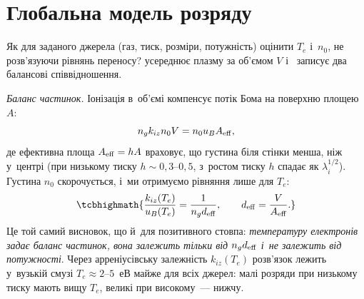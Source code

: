 \section{Глобальна модель розряду}\label{sec:global-model}

Як для заданого джерела (газ, тиск, розміри, потужність) оцінити $T_e$ і~$n_0$, не
розв'язуючи рівнянь переносу?  усереднює плазму за об'ємом $V$ і~
записує два балансові співвідношення.

\emph{Баланс частинок.} Іонізація в~об'ємі компенсує потік Бома на поверхню площею $A$:
\begin{equation*}
	n_gk_{iz}n_0V=n_0u_BA_{\rm eff},
\end{equation*}
де ефективна площа $A_{\rm eff}=h A$ враховує, що густина біля стінки менша, ніж у~центрі
(при низькому тиску $h\sim0{,}3$--$0{,}5$, з~ростом тиску $h$ спадає як $\lambda_i^{1/2}$). Густина $n_0$ скорочується, і~ми
отримуємо рівняння лише для $T_e$:
\begin{equation}\label{eq:global-te}
	\tcbhighmath{\frac{k_{iz}(T_e)}{u_B(T_e)}=\frac1{n_gd_{\rm eff}},\qquad d_{\rm eff}=\frac V{A_{\rm eff}}.}
\end{equation}
Це той самий висновок, що й~для позитивного стовпа: \emph{температуру електронів задає баланс
частинок, вона залежить тільки від $n_gd_{\rm eff}$ і~не залежить від потужності}. Через
арреніусівську залежність $k_{iz}(T_e)$ розв'язок лежить у~вузькій смузі $T_e\approx2$--$5$~еВ
майже для всіх джерел: малі розряди при низькому тиску мають вищу $T_e$, великі при високому~--- нижчу.

